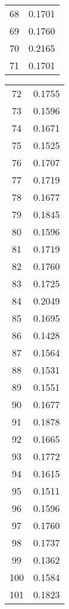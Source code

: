 \begin{multicols}{4}
\begin{table}[H]
\begin{tabular}{|c|r|}
            68  & 0.1701 \\
            69  & 0.1760 \\
            70  & 0.2165 \\
            71  & 0.1701 \\
            \hline
        \end{tabular}
    \end{table}
    \columnbreak
    \begin{table}[H]
        \centering
        \begin{tabular}{|c|r|}
            \hline
            72  & 0.1755 \\
            73  & 0.1596 \\
            74  & 0.1671 \\
            75  & 0.1525 \\
            76  & 0.1707 \\
            77  & 0.1719 \\
            78  & 0.1677 \\
            79  & 0.1845 \\
            80  & 0.1596 \\
            81  & 0.1719 \\
            82  & 0.1760 \\
            83  & 0.1725 \\
            84  & 0.2049 \\
            85  & 0.1695 \\
            86  & 0.1428 \\
            87  & 0.1564 \\
            88  & 0.1531 \\
            89  & 0.1551 \\
            90  & 0.1677 \\
            91  & 0.1878 \\
            92  & 0.1665 \\
            93  & 0.1772 \\
            94  & 0.1615 \\
            95  & 0.1511 \\
            96  & 0.1596 \\
            97  & 0.1760 \\
            98  & 0.1737 \\
            99  & 0.1362 \\
            100 & 0.1584 \\
            101 & 0.1823 \\

\end{tabular}
\end{table}
\end{multicols}
